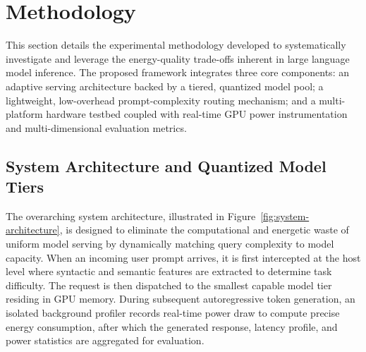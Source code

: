 \documentclass[runningheads]{llncs}
\begin{document}
\endgroup

\FloatBarrier
\vspace{1.5em}

\section{Methodology}
\label{sec:methodology}

This section details the experimental methodology developed to systematically investigate and leverage the energy-quality trade-offs inherent in large language model inference. The proposed framework integrates three core components: an adaptive serving architecture backed by a tiered, quantized model pool; a lightweight, low-overhead prompt-complexity routing mechanism; and a multi-platform hardware testbed coupled with real-time GPU power instrumentation and multi-dimensional evaluation metrics.

\subsection{System Architecture and Quantized Model Tiers}
\label{subsec:system-architecture}

The overarching system architecture, illustrated in Figure~\ref{fig:system-architecture}, is designed to eliminate the computational and energetic waste of uniform model serving by dynamically matching query complexity to model capacity. When an incoming user prompt arrives, it is first intercepted at the host level where syntactic and semantic features are extracted to determine task difficulty. The request is then dispatched to the smallest capable model tier residing in GPU memory. During subsequent autoregressive token generation, an isolated background profiler records real-time power draw to compute precise energy consumption, after which the generated response, latency profile, and power statistics are aggregated for evaluation.
\end{document}
